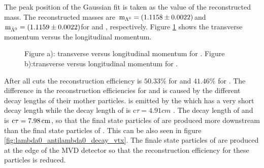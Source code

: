 		The peak position of the Gaussian fit is taken as the value of the reconstructed mass.
		The reconstructed masses are $\textnormal{m}_{\Lambda^0} = \left(1.1158 \pm 0.0022\right)$\massunit and 
		$\textnormal{m}_{\bar{\Lambda}^0} = \left(1.1159 \pm 0.0022\right)$\massunit for \lam and \alam, respectively. 
		Figure \ref{fig:lambda0_pt_vs_pz} shows the transverse momentum versus the longitudinal momentum.
				
		\begin{figure}
			
			\caption{\propose Figure a): transverse versus longitudinal momentum for \lam. Figure b):transverse versus longitudinal momentum for \alam.}
			\label{fig:lambda0_pt_vs_pz}
		
		\end{figure}
		After all cuts the reconstruction efficiency is $50.33\%$ for \lam and $41.46\%$ for \alam.
		The difference in the reconstruction efficiencies for \lam and \alam is caused by the different decay lengths of their mother particles.
		\lam is emitted by the \excitedcascade which has a very short decay length while the decay length of \anticascade is 
		c$\tau = 4.91 \unit{cm}$ \cite{PDG}.
		The decay length of \lam and \alam is $\textnormal{c}\tau = 7.98 \, \textnormal{cm}$, so that the final state particles of \alam are produced more downstream 
		than the final state particles of \lam.
		This can be also seen in figure \ref{fig:lambda0_antilambda0_decay_vtx}.
		The finale state particles of \alam are produced at the edge of the MVD detector so that the reconstruction efficiency for these particles is reduced.
		
